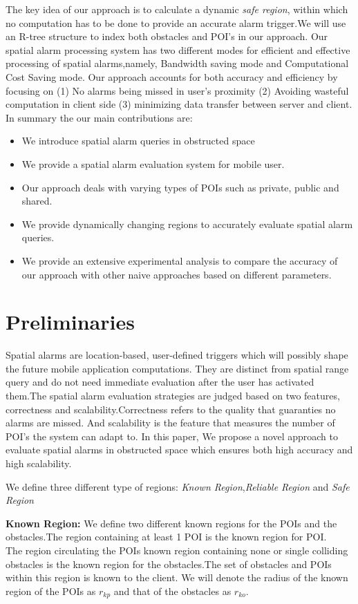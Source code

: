 \documentclass{sig-alternate}
\begin{document}
The key idea of our approach is to calculate a dynamic \textit{safe region}, within which no computation has to be done to provide an accurate alarm trigger.We will use an R-tree structure to index both obstacles and POI's in our approach. Our spatial alarm processing system has two different modes for efficient and effective processing of spatial alarms,namely, Bandwidth saving mode and Computational Cost Saving mode. Our approach accounts for both accuracy and efficiency by focusing on (1) No alarms being missed in user's proximity (2) Avoiding wasteful computation in client side (3) minimizing data transfer between server and client. In summary the our main contributions are: 
\begin{itemize}
\setlength\itemsep{0em}
\item We introduce spatial alarm queries in obstructed space
\item We provide a spatial alarm evaluation system for mobile user.
\item Our approach deals with varying types of POIs such as private, public and shared.
\item We provide dynamically changing regions to accurately evaluate spatial alarm queries.
\item We provide an extensive experimental analysis to compare the accuracy of our approach with other naive approaches based on different parameters.
\end{itemize}


\section{Preliminaries}
Spatial alarms are location-based, user-defined triggers which will possibly shape the future mobile application computations. They are distinct from spatial range query and do not need immediate evaluation after the user has activated them.The spatial alarm evaluation strategies are judged based on two features, correctness and scalability.Correctness refers to the quality that guaranties no alarms are missed. And scalability is the feature that measures the number of POI's the system can adapt to. 
In this paper, We propose a novel approach to evaluate spatial alarms in obstructed space which ensures both high accuracy and high scalability.

We define three different type of regions: \textit{Known Region},\textit{Reliable Region} and \textit{Safe Region}

\begin{defn} 
\textbf{Known Region:} We define two different known regions for the POIs and the obstacles.The region containing at least 1 POI is the known region for POI.\\
The region circulating the POIs known region containing none or single colliding obstacles is the known region for the obstacles.The set of obstacles and POIs within this region is known to the client. 
We will denote the radius of the known region of the POIs as $r_{kp}$ and that of the obstacles as $r_{ko}$.
\end{defn}
\end{document}
